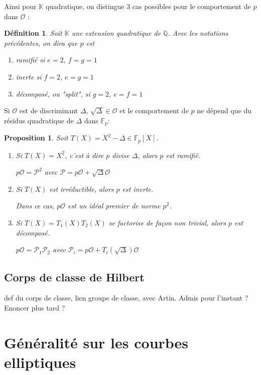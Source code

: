 \documentclass{article}
\newcommand{\Q}[0]{\mathbb{Q}}
\newcommand{\K}[0]{\mathbb{K}}
\newcommand{\OR}[0]{\mathcal{O}}
\newcommand{\PR}[0]{\mathcal{P}}
\newcommand{\F}[0]{\mathbb{F}}
\newtheorem{Prop}[The]{Proposition}
\newtheorem{Def}[The]{Définition}
\begin{document}
Ainsi pour $\K$ quadratique, on distingue $3$ cas possibles pour le comportement de $p$ dans $\OR$ :

\begin{Def}
	
	Soit $\K$ une extension quadratique de $\Q$.
	Avec les notations précédentes, on dira que $p$ est
	\begin{enumerate}
		\item ramifié si $e = 2$, $f = g = 1$
		\item inerte si $f = 2$, $e = g = 1$
		\item décomposé, ou "split", si $g = 2$, $e = f = 1$
	\end{enumerate}
	
\end{Def}

Si $\OR$ est de discriminant $\Delta$, $\sqrt{\Delta}\in\OR$ et le comportement de $p$ ne dépend que du résidus quadratique de $\Delta$ dans $\F_{p}$:

\begin{Prop}
	Soit $T(X) = X^2 - \Delta \in\F_{p}\left[ X\right] $. 
	\begin{enumerate}
		\item Si $T(X) = X^2$, c'est à dire $p$ divise $\Delta$, alors $p$ est ramifié.
		
		$p\OR = \PR^{2}$ avec $\PR = p\OR + \sqrt{\Delta}\OR$
		
		\item Si $T(X)$ est irréductible, alors $p$ est inerte.
		
		Dans ce cas, $p\OR$ est un idéal premier de norme $p^{2}$.
		
		\item Si $T(X) = T_{1}(X)T_{2}(X)$ se factorise de façon non trivial, alors $p$ est décomposé.
		
		$p\OR = \PR_{1}\PR_{2}$ avec $\PR_{i} = p\OR + T_{i}(\sqrt{\Delta})\OR$
	\end{enumerate}
\end{Prop}


\subsection{Corps de classe de Hilbert}

 def du corps de classe, lien groupe de classe, avec Artin. 
 Admis pour l'instant ? Enoncer plus tard ?

\section{Généralité sur les courbes elliptiques}
\end{document}
